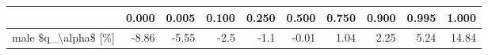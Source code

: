 \begin{tabular}{lrrrrrrrrr}
\toprule
{} &  0.000 &  0.005 &  0.100 &  0.250 &  0.500 &  0.750 &  0.900 &  0.995 &  1.000 \\
\midrule
male \$q\_\textbackslash alpha\$ [\%] &  -8.86 &  -5.55 &   -2.5 &   -1.1 &  -0.01 &   1.04 &   2.25 &   5.24 &  14.84 \\
\bottomrule
\end{tabular}
